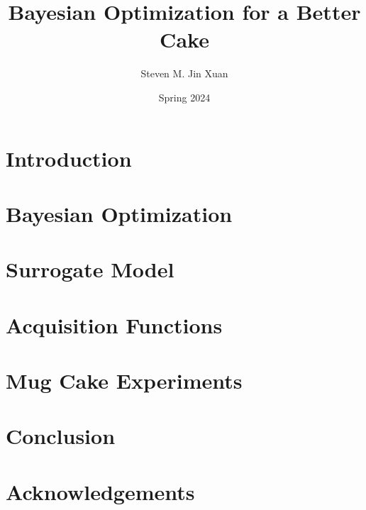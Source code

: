 \documentclass{article}[12, letterpaper]
\author{Steven M. Jin Xuan}
\date{Spring 2024}
\title{Bayesian Optimization for a Better Cake}
\begin{document}
\maketitle
\pagebreak


\section{Introduction}\label{sec:intro}

\section{Bayesian Optimization}\label{sec:bo}

\section{Surrogate Model}\label{sec:sm}





\section{Acquisition Functions}\label{sec:af}

\section{Mug Cake Experiments}\label{sec:exp}

\section{Conclusion}\label{sec:conclusion}

\section*{Acknowledgements}


\pagebreak
{}

\end{document}
